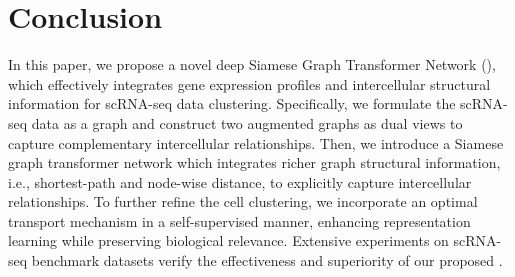 \section{Conclusion}
In this paper, we propose a novel deep Siamese Graph Transformer Network (\method{}), which effectively integrates gene expression profiles and intercellular structural information for scRNA-seq data clustering. Specifically, we formulate the scRNA-seq data as a graph and construct two augmented graphs as dual views to capture complementary intercellular relationships. Then, we introduce a Siamese graph transformer network which integrates richer graph structural information, i.e., shortest-path and node-wise distance, to explicitly capture intercellular relationships. To further refine the cell clustering, we incorporate an optimal transport mechanism in a self-supervised manner, enhancing representation learning while preserving biological relevance. Extensive experiments on scRNA-seq benchmark datasets verify the effectiveness and superiority of our proposed \method{}.


